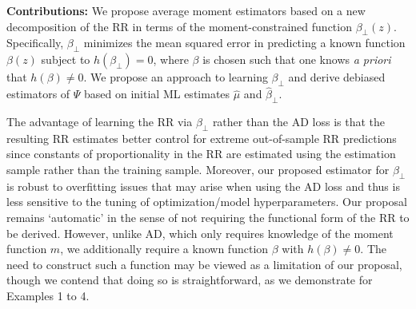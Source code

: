 
\textbf{Contributions:} We propose average moment estimators based on a new decomposition of the RR in terms of the moment-constrained function $\beta_\perp(z)$. Specifically, $\beta_\perp$ minimizes the mean squared error in predicting a known function $\beta(z)$ subject to $h(\beta_\perp) = 0$, where $\beta$ is chosen such that one knows \emph{a priori} that $h(\beta) \neq 0$. We propose an approach to learning $\beta_\perp$ and derive debiased estimators of $\Psi$ based on initial ML estimates $\hat{\mu}$ and $\hat{\beta}_\perp$.

The advantage of learning the RR via $\beta_\perp$ rather than the AD loss is that the resulting RR estimates better control for extreme out-of-sample RR predictions since constants of proportionality in the RR are estimated using the estimation sample rather than the training sample. Moreover, our proposed estimator for $\beta_\perp$ is robust to overfitting issues that may arise when using the AD loss and thus is less sensitive to the tuning of optimization/model hyperparameters. Our proposal remains `automatic' in the sense of not requiring the functional form of the RR to be derived. However, unlike AD, which only requires knowledge of the moment function $m$, we additionally require a known function $\beta$ with $h(\beta) \neq 0$. The need to construct such a function may be viewed as a limitation of our proposal, though we contend that doing so is straightforward, as we demonstrate for Examples 1 to 4.

